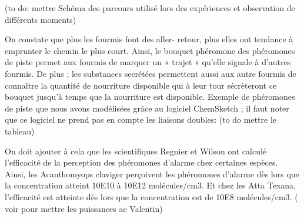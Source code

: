 (to do: mettre Schéma des parcours utilisé lors des expériences et
observation de différents moments)

On constate que plus les fourmis font des aller- retour, plus elles ont
tendance à emprunter le chemin le plus court. Ainsi, le bouquet
phéromone des phéromones de piste permet aux fourmis de marquer un «
trajet » qu'elle signale à d'autres fourmis. De plus ; les substances
secrétées permettent aussi aux autre fourmis de connaître la quantité de
nourriture disponible qui à leur tour sécrèteront ce bouquet jusqu'à
temps que la nourriture est disponible. Exemple de phéromones de piste
que nous avons modélisées grâce au logiciel ChemSketch ; il faut noter
que ce logiciel ne prend pas en compte les liaisons doubles: (to do
mettre le tableau)

On doit ajouter à cela que les scientifiques Regnier et Wilson ont
calculé l'efficacité de la perception des phéromones d'alarme chez
certaines espèces. Ainsi, les Acanthomyops claviger perçoivent les
phéromones d'alarme dès lors que la concentration atteint 10E10 à 10E12
molécules/cm3. Et chez les Atta Texana, l'efficacité est atteinte dès
lors que la concentration est de 10E8 molécules/cm3. ( voir pour mettre
les puissances ac Valentin)

